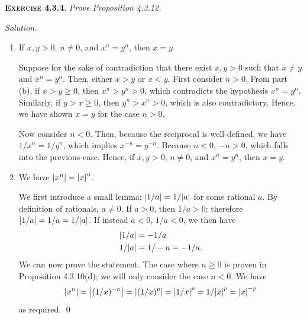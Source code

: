 \documentclass[12pt]{article}
\theoremstyle{remark}
\newenvironment{exer}[2]{
    \noindent \setlength{\parskip}{1em}%
    \textsc{\textbf{Exercise #1}}. \textit{#2} \par
    \noindent \textit{Solution.} %
}{\bigskip}
\begin{document}
\begin{exer}{4.3.4}{
    Prove Proposition 4.3.12.
}
\begin{enumerate}[topsep=0mm,label=(\alph*)]
            Since $1/y \ge 1/x > 0$, we can apply previous results to show
            \begin{align*}
                (1/y)^{-n} \ge (1/x)^{-n} &> 0 \\
                y^{-(-n)} \ge x^{-(-n)} &> 0 \\
                y^n \ge x^n &> 0
            \end{align*}
            as required.

        \item If $x, y > 0$, $n \ne 0$, and $x^n = y^n$, then $x = y$.

            Suppose for the sake of contradiction that there exist $x, y> 0$ such that $x \ne y$ and $x^n = y^n$.
            Then, either $x > y$ or $x < y$.
            First consider $n > 0$.
            From part (b), if $x > y \ge 0$, then $x^n > y^n > 0$, which contradicts the hypothesis $x^n = y^n$.
            Similarly, if $y > x \ge 0$, then $y^n > x^n > 0$, which is also contradictory.
            Hence, we have shown $x = y$ for the case $n > 0$.
            
            Now consider $n < 0$.
            Then, because the reciprocal is well-defined, we have $1/x^n = 1/y^n$, which implies $x^{-n} = y^{-n}$.
            Because $n < 0$, $-n > 0$, which falls into the previous case.
            Hence, if $x, y > 0$, $n \ne 0$, and $x^n = y^n$, then $x = y$.

        \item We have $\abs{x^n} = \abs{x}^n$.

            We first introduce a small lemma: $\abs{1/a} = 1/\abs{a}$ for some rational $a$.
            By definition of rationals, $a \ne 0$.
            If $a > 0$, then $1/a > 0$; therefore $\abs{1/a} = 1/a = 1/\abs{a}$.
            If instead $a < 0$, $1/a < 0$, we then have
            \begin{align*}
                \abs{1/a} &= -1/a \\
                1/\abs{a} &= 1/-a = -1/a.
            \end{align*}
            We can now prove the statement.
            The case where $n \ge 0$ is proven in Proposition 4.3.10(d); we will only consider the case $n < 0$.
            We have
            \[
                \abs{x^n} = \abs{(1/x)^{-n}} = \abs{(1/x)^p} = \abs{1/x}^p = 1/\abs{x}^p = \abs{x}^{-p}
            \]
            as required. \qed
    \end{enumerate}
\end{exer}
\end{document}
